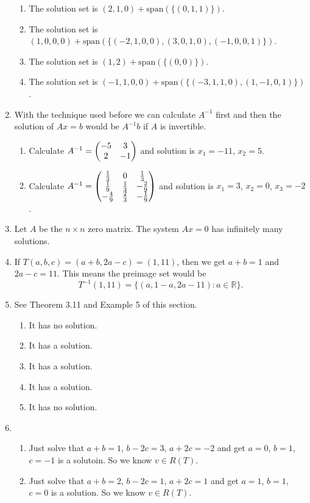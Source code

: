 \begin{enumerate}
\begin{enumerate}
\item The solution set is $(2,1,0)+\mathrm{span}(\{(0,1,1)\})$.
\item The solution set is $(1,0,0,0)+\mathrm{span}(\{(-2,1,0,0),(3,0,1,0),(-1,0,0,1)\})$.
\item The solution set is $(1,2)+\mathrm{span}(\{(0,0)\})$.
\item The solution set is $(-1,1,0,0)+\mathrm{span}(\{(-3,1,1,0),(1,-1,0,1)\})$.
\end{enumerate}
\item With the technique used before we can calculate $A^{-1}$ first and then the solution of $Ax=b$ would be $A^{-1}b$ if $A$ is invertible.\begin{enumerate}
\item Calculate $A^{-1}=\begin{pmatrix}-5 & 3\cr 2 & -1\end{pmatrix}$ and solution is $x_1=-11$, $x_2=5$.
\item Calculate $A^{-1}=\begin{pmatrix}\frac{1}{3} & 0 & \frac{1}{3}\cr \frac{1}{9} & \frac{1}{3} & -\frac{2}{9}\cr -\frac{4}{9} & \frac{2}{3} & -\frac{1}{9}\end{pmatrix}$ and solution is $x_1=3$, $x_2=0$, $x_3=-2$.
\end{enumerate}
\item Let $A$ be the $n\times n$ zero matrix. The system $Ax=0$ has infinitely many solutions.
\item If $T(a,b,c)=(a+b,2a-c)=(1,11)$, then we get $a+b=1$ and $2a-c=11$. This means the preimage set would be 
\[T^{-1}(1,11)=\{(a,1-a,2a-11):a\in \mathbb{R}\}.\]
\item See Theorem 3.11 and Example 5 of this section.\begin{enumerate}
\item It has no solution.
\item It has a solution.
\item It has a solution.
\item It has a solution.
\item It has no solution.
\end{enumerate}
\item \begin{enumerate}
\item Just solve that $a+b=1$, $b-2c=3$, $a+2c=-2$ and get $a=0$, $b=1$, $c=-1$ is a solutoin. So we know $v\in R(T)$.
\item Just solve that $a+b=2$, $b-2c=1$, $a+2c=1$ and get $a=1$, $b=1$, $c=0$ is a solution. So we know $v\in R(T)$.

\end{enumerate}
\end{enumerate}

